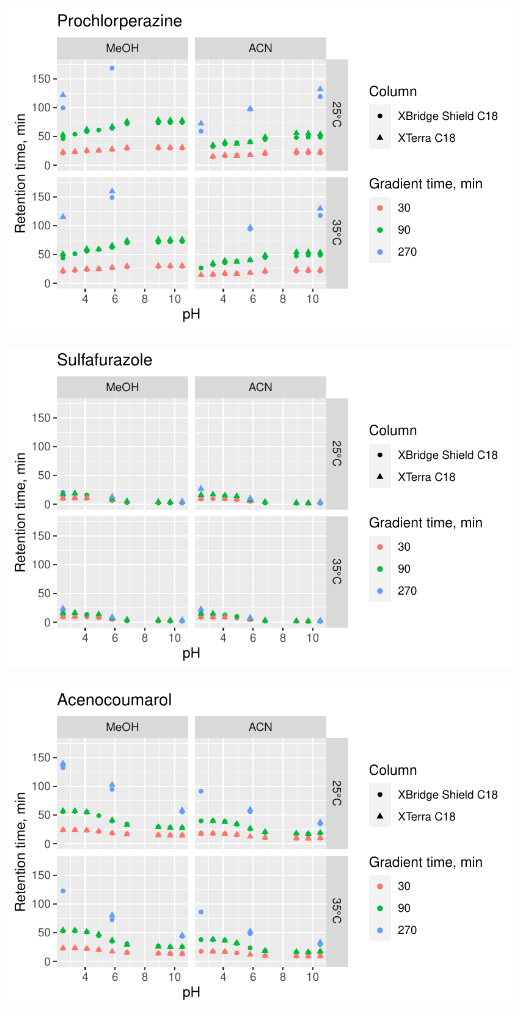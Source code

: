 \documentclass[
  letterpaper,
  DIV=11,
  numbers=noendperiod]{scrreprt}
\begin{document}
\includegraphics{index_files/figure-pdf/unnamed-chunk-4-180.pdf}

\includegraphics{index_files/figure-pdf/unnamed-chunk-4-181.pdf}

\includegraphics{index_files/figure-pdf/unnamed-chunk-4-182.pdf}
\end{document}
